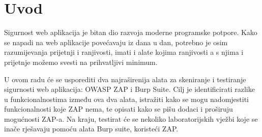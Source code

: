 \chapter{Uvod}
\par Sigurnost web aplikacija je bitan dio razvoja moderne programske potpore. 
Kako se napadi na web aplikacije povećavaju iz dana u dan, potrebno je osim razumijevanja 
prijetnji i ranjivosti, imati i alate kojima ranjivosti a s njima i prijetnje možemo svesti na prihvatljivi minimum.




U ovom radu će se usporediti dva najraširenija alata za skeniranje i testiranje sigurnosti web aplikacija: OWASP ZAP i Burp Suite. 
Cilj je identificirati razlike u funkcionalnostima između ova dva alata, istražiti kako se mogu nadomjestiti funkcionalnosti koje ZAP 
nema, te opisati kako se pišu dodaci i proširuju mogućnosti ZAP-a. Na kraju, testirat će se nekoliko laboratorijskih vježbi koje se 
inače rješavaju pomoću alata Burp suite, koristeći ZAP.

